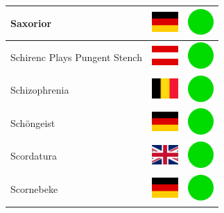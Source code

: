 \documentclass[12pt, a4paper, twoside]{report}
\begin{document}
\begin{center}
\begin{longtable}{|p{5cm}|p{2cm}|p{2cm}|}
Saxorior & \includegraphics[width=1cm]{4x3/de} & \includegraphics[width=1cm]{likes/y} \\ \hline
Schirenc Plays Pungent Stench & \includegraphics[width=1cm]{4x3/at} & \includegraphics[width=1cm]{likes/y} \\ \hline
Schizophrenia & \includegraphics[width=1cm]{4x3/be} & \includegraphics[width=1cm]{likes/y} \\ \hline
Schöngeist & \includegraphics[width=1cm]{4x3/de} & \includegraphics[width=1cm]{likes/y} \\ \hline
Scordatura & \includegraphics[width=1cm]{4x3/gb} & \includegraphics[width=1cm]{likes/y} \\ \hline
Scornebeke & \includegraphics[width=1cm]{4x3/de} & \includegraphics[width=1cm]{likes/y} \\ \hline

\end{longtable}
\end{center}
\end{document}
